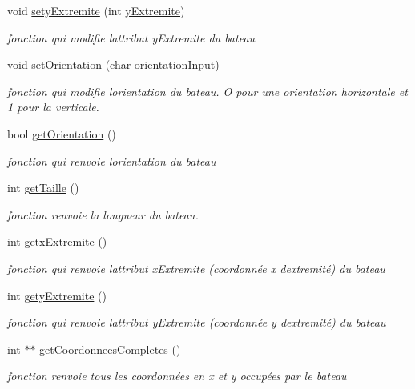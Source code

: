 \begin{DoxyCompactItemize}
void \hyperlink{class_bateau_a7fa9258d53309fcf41de04199d702fe7}{sety\+Extremite} (int \hyperlink{class_bateau_a32294182fa76970d9be2c4de5d8329e6}{y\+Extremite})
\begin{DoxyCompactList}\small\item\em fonction qui modifie l\textquotesingle{}attribut y\+Extremite du bateau \end{DoxyCompactList}\item 
void \hyperlink{class_bateau_a0c88ac8759c24674a23b7523cb3f6667}{set\+Orientation} (char orientation\+Input)
\begin{DoxyCompactList}\small\item\em fonction qui modifie l\textquotesingle{}orientation du bateau. O pour une orientation horizontale et 1 pour la verticale. \end{DoxyCompactList}\item 
bool \hyperlink{class_bateau_a693e60e6b97d17a04b3f10de4e68f741}{get\+Orientation} ()
\begin{DoxyCompactList}\small\item\em fonction qui renvoie l\textquotesingle{}orientation du bateau \end{DoxyCompactList}\item 
int \hyperlink{class_bateau_a9f0b81c06a5760d0aa40bed0cb9d2a58}{get\+Taille} ()
\begin{DoxyCompactList}\small\item\em fonction renvoie la longueur du bateau. \end{DoxyCompactList}\item 
int \hyperlink{class_bateau_ad8a7212a50596757a10a429ed69400ce}{getx\+Extremite} ()
\begin{DoxyCompactList}\small\item\em fonction qui renvoie l\textquotesingle{}attribut x\+Extremite (coordonnée x d\textquotesingle{}extremité) du bateau \end{DoxyCompactList}\item 
int \hyperlink{class_bateau_a326527275685c457dd95fd1a71924b21}{gety\+Extremite} ()
\begin{DoxyCompactList}\small\item\em fonction qui renvoie l\textquotesingle{}attribut y\+Extremite (coordonnée y d\textquotesingle{}extremité) du bateau \end{DoxyCompactList}\item 
int $\ast$$\ast$ \hyperlink{class_bateau_a55c31fbdc2dc0c92786583d9bbd14985}{get\+Coordonnees\+Completes} ()
\begin{DoxyCompactList}\small\item\em fonction renvoie tous les coordonnées en x et y occupées par le bateau \end{DoxyCompactList}\end{DoxyCompactItemize}
